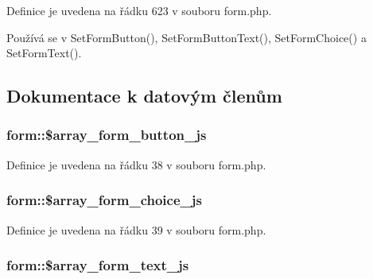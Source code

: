 Definice je uvedena na řádku 623 v souboru form.\-php.



Používá se v Set\-Form\-Button(), Set\-Form\-Button\-Text(), Set\-Form\-Choice() a Set\-Form\-Text().



\subsection{Dokumentace k datovým členům}
\hypertarget{classform_ad53a238e14d004340fc818fb85b20dde}{
\subsubsection[{\$array\-\_\-form\-\_\-button\-\_\-js}]{\setlength{\rightskip}{0pt plus 5cm}form\-::\$array\-\_\-form\-\_\-button\-\_\-js}}\label{classform_ad53a238e14d004340fc818fb85b20dde}


Definice je uvedena na řádku 38 v souboru form.\-php.

\hypertarget{classform_a75d77dd70ea8d99f72e7aa228c87d5ad}{
\subsubsection[{\$array\-\_\-form\-\_\-choice\-\_\-js}]{\setlength{\rightskip}{0pt plus 5cm}form\-::\$array\-\_\-form\-\_\-choice\-\_\-js}}\label{classform_a75d77dd70ea8d99f72e7aa228c87d5ad}


Definice je uvedena na řádku 39 v souboru form.\-php.

\hypertarget{classform_a9294bfde7f7e7b436920bc7c497a2ee9}{
\subsubsection[{\$array\-\_\-form\-\_\-text\-\_\-js}]{\setlength{\rightskip}{0pt plus 5cm}form\-::\$array\-\_\-form\-\_\-text\-\_\-js}}\label{classform_a9294bfde7f7e7b436920bc7c497a2ee9}


